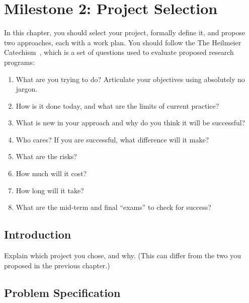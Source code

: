 \documentclass{report}
\begin{document}
\chapter{Milestone 2: Project Selection}

In this chapter, you should select your project, formally define it, and propose two approaches, each with a work plan.  You should follow the The Heilmeier Catechism~\cite{heilmeier}, which is a set of questions used to evaluate proposed research programs:  
\begin{enumerate}
    \item What are you trying to do? Articulate your objectives using absolutely no jargon.
   \item How is it done today, and what are the limits of current practice?
   \item What is new in your approach and why do you think it will be successful?
   \item Who cares? If you are successful, what difference will it make?
   \item What are the risks?
   \item How much will it cost?
   \item How long will it take?
   \item What are the mid-term and final ``exams'' to check for success?
\end{enumerate}

\section{Introduction}

Explain which project you chose, and why. (This can differ from the two you proposed in the previous chapter.) 

\section{Problem Specification}

\end{document}
